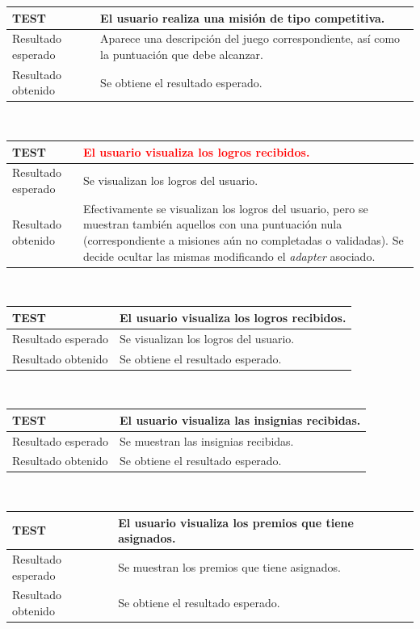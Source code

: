 \documentclass[twoside]{report}
\newcommand\addrow[2]{#1 &#2\\ }
\newcommand\addheading[2]{#1 &#2\\ \hline}
\newcommand\tabularhead{\begin{tabular}{lp{0.7\textwidth}}
\hline
}
\newenvironment{test}{\tabularhead}
{\hline\end{tabular}}
\begin{document}
\vspace{0.5cm}

\begin{test}
  \addheading{\textbf{TEST\arabic{test}}}{El usuario realiza una misión de tipo competitiva.} 
  \addrow{Resultado esperado}{Aparece una descripción del juego correspondiente, así como la puntuación que debe alcanzar.}
  \addrow{Resultado obtenido}{Se obtiene el resultado esperado.}
\end{test}\\

\vspace{0.5cm}

\begin{test}
  \addheading{\textbf{TEST\arabic{test}}}{\textcolor{red}{El usuario visualiza los logros recibidos.}}
  \addrow{Resultado esperado}{Se visualizan los logros del usuario.}
  \addrow{Resultado obtenido}{Efectivamente se visualizan los logros del usuario, pero se muestran también aquellos con una puntuación nula (correspondiente a misiones aún no completadas o validadas). Se decide ocultar las mismas modificando el \textit{adapter} asociado.}
\end{test}\\

\vspace{0.5cm}

\begin{test}
  \addheading{\textbf{TEST\arabic{test}}}{El usuario visualiza los logros recibidos.} 
  \addrow{Resultado esperado}{Se visualizan los logros del usuario.}
  \addrow{Resultado obtenido}{Se obtiene el resultado esperado.}
\end{test}\\

\vspace{0.5cm}

\begin{test}
  \addheading{\textbf{TEST\arabic{test}}}{El usuario visualiza las insignias recibidas.} 
  \addrow{Resultado esperado}{Se muestran las insignias recibidas.}
  \addrow{Resultado obtenido}{Se obtiene el resultado esperado.}
\end{test}\\

\vspace{0.5cm}

\begin{test}
  \addheading{\textbf{TEST\arabic{test}}}{El usuario visualiza los premios que tiene asignados.} 
  \addrow{Resultado esperado}{Se muestran los premios que tiene asignados.}
  \addrow{Resultado obtenido}{Se obtiene el resultado esperado.}
\end{test}\\
\end{document}
